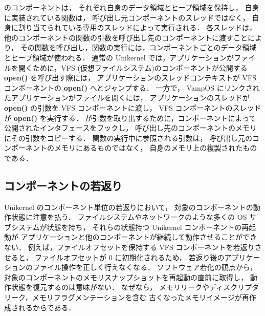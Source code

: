 \sysname のコンポーネントは，
それぞれ自身のデータ領域とヒープ領域を保持し，
自身に実装されている関数は，
呼び出し元コンポーネントのスレッドではなく，
自身に割り当てられている専用のスレッドによって実行される．
各スレッドは，
他のコンポーネントの関数の引数を呼び出し先のコンポーネントに渡すことにより，
その関数を呼び出し，関数の実行には，コンポーネントごとのデータ領域とヒープ領域が使われる．
通常の Unikernel では，アプリケーションがファイルを開くために，VFS (仮想ファイルシステム)のコンポーネントが公開する \textbf{open()} を呼び出す際には，
アプリケーションのスレッドコンテキストが VFS コンポーネントの \textbf{open()} へとジャンプする．
一方で， VampOS にリンクされたアプリケーションがファイルを開くには，
アプリケーションのスレッドが \textbf{open()} の引数を VFS コンポーネントに渡し，
VFS コンポーネントのスレッドが \textbf{open()} を実行する．
\sysname が引数を取り出するために，コンポーネントによって公開されたインタフェースをフックし，
呼び出し先のコンポーネントのメモリにその引数をコピーする．
関数の実行中に参照される引数は，
呼び出し元のコンポーネントのメモリにあるものではなく，
自身のメモリ上の複製されたものである．


\subsection{コンポーネントの若返り}

Unikernel のコンポーネント単位の若返りにおいて，
対象のコンポーネントの動作状態に注意を払う．
ファイルシステムやネットワークのような多くの OS サブシステムが状態を持ち，
それらの状態持つ Unikernel コンポーネントの再起動が
アプリケーションと他のコンポーネントが継続して動作させることができない．
例えば，ファイルオフセットを保持する VFS コンポーネントを若返りさせると，
ファイルオフセットが 0 に初期化されるため，
若返り後のアプリケーションのファイル操作を正しく行えなくなる．
ソフトウェア若化の観点から，
対象のコンポーネントのメモリスナップショットを再起動の直前に取得し，
動作状態を復元するのは意味がない．
なぜなら，
メモリリークやディスクリプタリーク，メモリフラグメンテーションを含む
古くなったメモリイメージが再作成されるからである．

